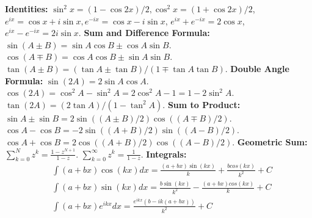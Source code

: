 {\bf Identities:} $\sin^2x = (1-\cos 2x)/2, \cos^2x = (1+\cos 2x)/2$, $e^{ix}=\cos x + i \sin x, e^{-ix}=\cos x - i \sin x$,  \newline$e^{ix}+e^{-ix}=2\cos x$,\newline $e^{ix}-e^{-ix}=2i\sin x$. \newline%
{\bf Sum and Difference Formula:} $\sin(A\pm B)=\sin A \cos B\pm \cos A \sin B$. $\cos(A\mp B)=\cos A \cos B\pm \sin A \sin B$. $\tan(A \pm B)=(\tan A\pm \tan B)/(1\mp \tan A \tan B)$. \newline
{\bf Double Angle Formula:}  $\sin(2A)=2 \sin A \cos A$. $\cos(2A)=\cos^2 A-\sin^2 A=2 \cos^2 A-1=1-2\sin^2 A$. $\tan(2A)=(2\tan A)/(1-\tan^2 A)$.  \newline
{\bf Sum to Product:} $\sin A\pm \sin B=2\sin((A\pm B)/2)\cos((A\mp B)/2)$. $\cos A - \cos B=-2\sin((A+B)/2)\sin((A-B)/2)$. $\cos A + \cos B=2\cos((A+B)/2)\cos((A-B)/2)$. \newline
{\bf Geometric Sum:} $\sum_{k=0}^N z^k=\frac{1-z^{N+1}}{1-z}$. $\sum_{k=0}^{\infty}z^k=\frac{1}{1-z}$.  \newline
{\bf Integrals: }
\begin{align*}
&\int (a+bx)\cos(kx)dx=\frac{(a+bx)\sin(kx)}{k}+\frac{bcos(kx)}{k^2}+C\\
&\int (a+bx)\sin(kx)dx=\frac{b\sin(kx)}{k^2}-\frac{(a+bx)cos(kx)}{k}+C\\
&\int (a+bx)e^{ikx}dx=\frac{e^{ikx}(b-ik(a+bx))}{k^2}+C\\
\end{align*}